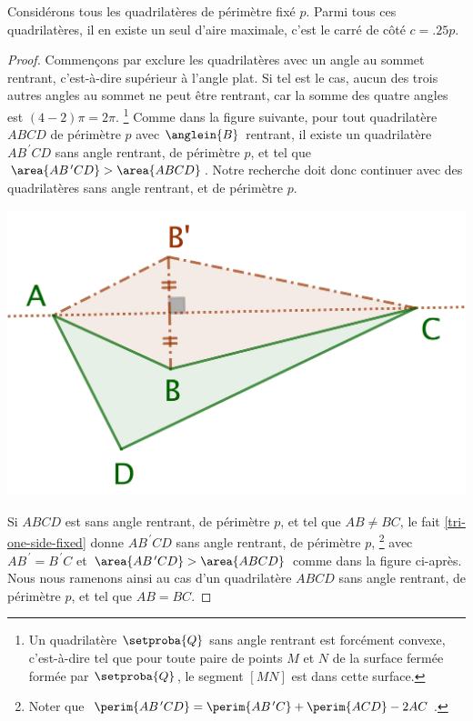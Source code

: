 \begin{fact} \label{quadri}
	Considérons tous les quadrilatères de périmètre fixé $p$. Parmi tous ces quadrilatères, il en existe un seul d'aire maximale, c'est le carré de côté $c = \num{.25} p$.
\end{fact}


\begin{proof}
    Commençons par exclure les quadrilatères avec un angle au sommet rentrant, c'est-à-dire supérieur à l'angle plat. 
    Si tel est le cas, aucun des trois autres angles au sommet ne peut être rentrant, car la somme des quatre angles est $(4 - 2)\pi = 2 \pi$.%
    \footnote{
    	Un quadrilatère $\setproba{Q}$ sans angle rentrant est forcément convexe, c'est-à-dire tel que pour toute paire de points $M$ et $N$ de la surface fermée  formée par $\setproba{Q}$, le segment $[MN]$ est dans cette surface.
    }
    Comme dans la figure suivante, pour tout quadrilatère $ABCD$ de périmètre $p$ avec $\anglein{B}$ rentrant, il existe un quadrilatère $AB^{\,\prime}CD$ sans angle rentrant, de périmètre $p$, et tel que $\area{AB^{\,\prime}CD} > \area{ABCD}$.
	Notre recherche doit donc continuer avec des quadrilatères sans angle rentrant, et de périmètre $p$.

	\begin{center}
		\includegraphics[scale=.4]{content/quadrilateral/non-convex.png}
	\end{center}
	
	
	Si $ABCD$ est sans angle rentrant, de périmètre $p$, et tel que $AB \neq BC$, le fait \ref{tri-one-side-fixed} donne $AB^{\,\prime}CD$ sans angle rentrant, de périmètre $p$,%
	\footnote{
		Noter que
		$\perim{AB^{\,\prime}CD} = \perim{AB^{\,\prime}C} + \perim{ACD} - 2 AC$.
	}
	avec $AB^{\,\prime} = B^{\,\prime}C$ et $\area{AB^{\,\prime}CD} > \area{ABCD}$ comme dans la figure ci-après.
	Nous nous ramenons ainsi au cas d'un quadrilatère $ABCD$ sans angle rentrant, de périmètre $p$, et tel que $AB = BC$.


\end{proof}
